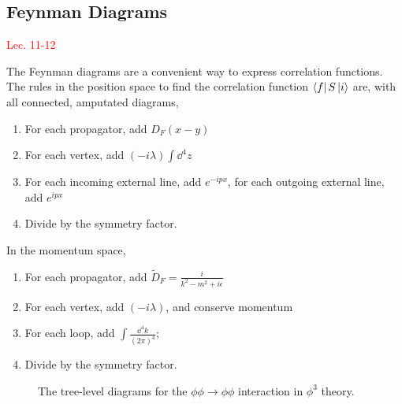 \documentclass{article}
\begin{document}
\subsection{Feynman Diagrams}
\textcolor{red}{Lec. 11-12}

The Feynman diagrams are a convenient way to express correlation functions. The rules in the position space to find the correlation function $\bra fS\ket i$ are, with all connected, amputated  diagrams, 
\begin{enumerate}
    \item For each propagator, add $D_F(x-y)$
    \item For each vertex, add $(-i\lambda)\int\dd^4z$
    \item For each incoming external line, add $e^{-ipx}$, for each outgoing external line, add $e^{ipx}$
    \item Divide by the symmetry factor.
\end{enumerate}
In the momentum space, 
\begin{enumerate}
    \item For each propagator, add $\tilde D_F=\frac{i}{k^2-m^2+i\epsilon}$
    \item For each vertex, add $(-i\lambda)$, and conserve momentum
    \item For each loop, add $\int\frac{\dd^4k}{(2\pi)^4}$;
    \item Divide by the symmetry factor.
\end{enumerate}

\begin{figure}
    \resizebox{.95\linewidth}{!}
    {
    \begin{feynman}
    \end{feynman}
    }
  \caption{The tree-level diagrams for the $\phi\phi\to\phi\phi$ interaction in $\phi^3$ theory.}
  \label{3.2-ff-ff}
\end{figure}
\end{document}
